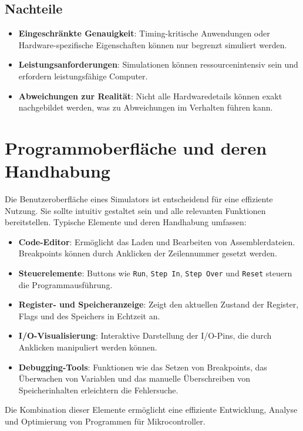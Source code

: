 \documentclass[a4paper,11pt]{report}
\begin{document}
\subsection*{Nachteile}
\begin{itemize}
    \item \textbf{Eingeschränkte Genauigkeit}: Timing-kritische Anwendungen oder Hardware-spezifische Eigenschaften können nur begrenzt simuliert werden.
    \item \textbf{Leistungsanforderungen}: Simulationen können ressourcenintensiv sein und erfordern leistungsfähige Computer.
    \item \textbf{Abweichungen zur Realität}: Nicht alle Hardwaredetails können exakt nachgebildet werden, was zu Abweichungen im Verhalten führen kann.
\end{itemize}

\section{Programmoberfläche und deren Handhabung}

Die Benutzeroberfläche eines Simulators ist entscheidend für eine effiziente Nutzung. Sie sollte intuitiv gestaltet sein und alle relevanten Funktionen bereitstellen. Typische Elemente und deren Handhabung umfassen:

\begin{itemize}
    \item \textbf{Code-Editor}: Ermöglicht das Laden und Bearbeiten von Assemblerdateien. Breakpoints können durch Anklicken der Zeilennummer gesetzt werden.
    \item \textbf{Steuerelemente}: Buttons wie \texttt{Run}, \texttt{Step In}, \texttt{Step Over} und \texttt{Reset} steuern die Programmausführung.
    \item \textbf{Register- und Speicheranzeige}: Zeigt den aktuellen Zustand der Register, Flags und des Speichers in Echtzeit an.
    \item \textbf{I/O-Visualisierung}: Interaktive Darstellung der I/O-Pins, die durch Anklicken manipuliert werden können.
    \item \textbf{Debugging-Tools}: Funktionen wie das Setzen von Breakpoints, das Überwachen von Variablen und das manuelle Überschreiben von Speicherinhalten erleichtern die Fehlersuche.
\end{itemize}

Die Kombination dieser Elemente ermöglicht eine effiziente Entwicklung, Analyse und Optimierung von Programmen für Mikrocontroller.
\end{document}
